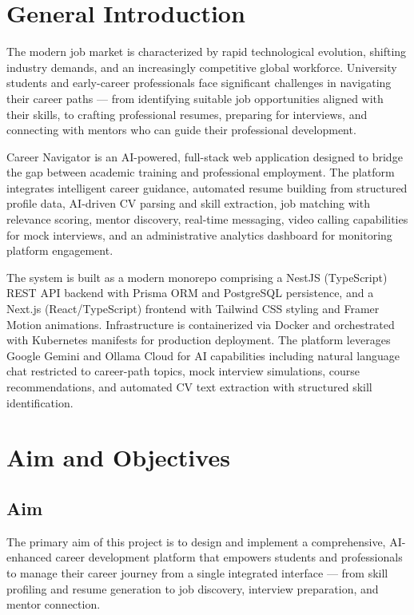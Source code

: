 \documentclass[12pt,a4paper]{report}
\begin{document}
\section{General Introduction}
The modern job market is characterized by rapid technological evolution, shifting industry demands, and an increasingly competitive global workforce. University students and early-career professionals face significant challenges in navigating their career paths — from identifying suitable job opportunities aligned with their skills, to crafting professional resumes, preparing for interviews, and connecting with mentors who can guide their professional development.

Career Navigator is an AI-powered, full-stack web application designed to bridge the gap between academic training and professional employment. The platform integrates intelligent career guidance, automated resume building from structured profile data, AI-driven CV parsing and skill extraction, job matching with relevance scoring, mentor discovery, real-time messaging, video calling capabilities for mock interviews, and an administrative analytics dashboard for monitoring platform engagement.

The system is built as a modern monorepo comprising a NestJS (TypeScript) REST API backend with Prisma ORM and PostgreSQL persistence, and a Next.js (React/TypeScript) frontend with Tailwind CSS styling and Framer Motion animations. Infrastructure is containerized via Docker and orchestrated with Kubernetes manifests for production deployment. The platform leverages Google Gemini and Ollama Cloud for AI capabilities including natural language chat restricted to career-path topics, mock interview simulations, course recommendations, and automated CV text extraction with structured skill identification.

\section{Aim and Objectives}

\subsection{Aim}
The primary aim of this project is to design and implement a comprehensive, AI-enhanced career development platform that empowers students and professionals to manage their career journey from a single integrated interface — from skill profiling and resume generation to job discovery, interview preparation, and mentor connection.
\end{document}
